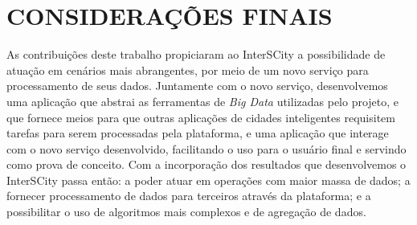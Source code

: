 \chapter{CONSIDERAÇÕES FINAIS}
\label{chapter:final}

As contribuições deste trabalho propiciaram ao InterSCity a possibilidade de
atuação em cenários mais abrangentes, por meio de um novo serviço
para processamento de seus dados. Juntamente com o novo serviço, desenvolvemos
uma aplicação que abstrai as ferramentas de \textit{Big Data} utilizadas pelo
projeto, e que fornece meios para que outras aplicações de cidades inteligentes
requisitem tarefas para serem processadas pela plataforma, e uma aplicação que
interage com o novo serviço desenvolvido, facilitando o uso para o usuário
final e servindo como prova de conceito. Com a incorporação
dos resultados que desenvolvemos o InterSCity passa então: a poder atuar em
operações com maior massa de dados; a fornecer processamento de dados para
terceiros através da plataforma; e a possibilitar o uso de algoritmos mais
complexos e de agregação de dados.

